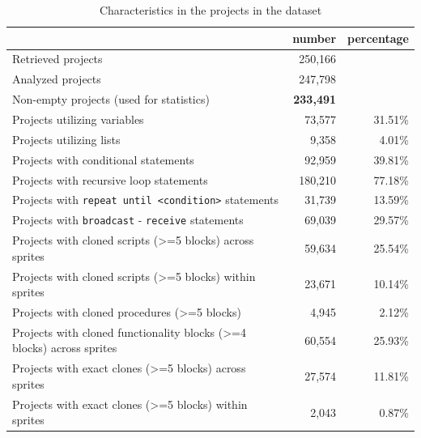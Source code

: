 \documentclass{sig-alternate}
\begin{document}
\begin{table}[ht]
	\centering
	\begin{tabular}{lrr}
		\hline
		&\textbf{number}&\textbf{percentage}\\
		\hline
		Retrieved projects & 250,166 & \\
		Analyzed projects & 247,798 & \\
		Non-empty projects (used for statistics) & \textbf{233,491} & \\

		Projects utilizing variables & 73,577 & 31.51\% \\
		Projects utilizing lists & 9,358 & 4.01\% \\
		Projects with conditional statements & 92,959 & 39.81\% \\
		Projects with recursive loop statements & 180,210 & 77.18\% \\
		Projects with \texttt{repeat until <condition>} statements & 31,739 & 13.59\% \\
		Projects with \texttt{broadcast} - \texttt{receive} statements & 69,039 & 29.57\%\\
		Projects with cloned scripts (>=5 blocks) across sprites & 59,634 & 25.54\% \\
		Projects with cloned scripts (>=5 blocks) within sprites & 23,671 & 10.14\%\\
		Projects with cloned procedures (>=5 blocks) & 4,945 & 2.12\%\\
		Projects with cloned functionality blocks (>=4 blocks) across sprites & 60,554 & 25.93\%\\
		Projects with exact clones (>=5 blocks) across sprites & 27,574 & 11.81\%\\
		Projects with exact clones (>=5 blocks) within sprites & 2,043 & 0.87\%\\
		\hline
	\end{tabular}
	\caption{Characteristics in the projects in the dataset}
	\label{tbl-characteristics}
\end{table}
\end{document}
